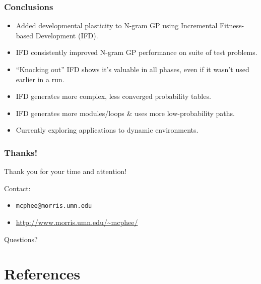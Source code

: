 \documentclass{beamer}
\newcommand{\linespace}{\vskip 0.25cm}
\begin{document}
\begin{frame}
\frametitle{Conclusions}

\begin{itemize}
  \item Added developmental plasticity to N-gram GP using Incremental Fitness-based Development (IFD).
\end{itemize}

\begin{itemize}
  \item IFD consistently improved N-gram GP performance on suite of test problems.
  
  \linespace
  
  \item ``Knocking out'' IFD shows it's valuable in all phases, even if it wasn't used earlier in a run.

  \linespace
  
  \item IFD generates more complex, less converged probability tables.
  \item IFD generates more modules/loops \& uses more low-probability paths.
\end{itemize}

\begin{itemize}
  \item Currently exploring applications to dynamic environments.
\end{itemize}

\end{frame}

\begin{frame}
\frametitle{Thanks!}

Thank you for your time and attention!
	
\linespace
\linespace

Contact:  
\begin{itemize}
	\item \texttt{mcphee@morris.umn.edu}
	\item \url{http://www.morris.umn.edu/~mcphee/}
\end{itemize}

\linespace
\linespace

\begin{center}
{\huge Questions?}
\end{center}
\end{frame}

\section*{References}
\end{document}
